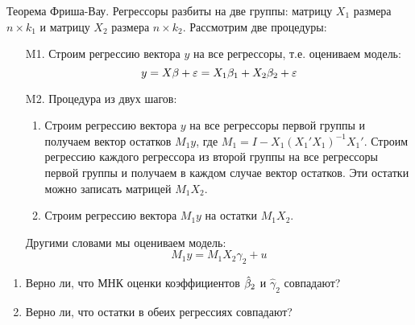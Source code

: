 \begin{problem}
Теорема Фриша-Вау. Регрессоры разбиты на две группы: матрицу $X_1$ размера $n\times k_1$ и матрицу $X_2$ размера $n\times k_2$. Рассмотрим две процедуры:
\begin{enumerate}
\item[M1.] Строим регрессию вектора $y$ на все регрессоры, т.е. оцениваем модель:
\[ 
y=X\beta + \varepsilon = X_1 \beta_1 + X_2 \beta_2 +\varepsilon 
\]
\item[M2.] Процедура из двух шагов:
\begin{enumerate}
\item Строим регрессию вектора $y$ на все регрессоры первой группы и получаем вектор остатков $M_1 y$, где $M_1=I-X_1(X_1'X_1)^{-1}X_1'$. Строим регрессию каждого регрессора из второй группы на все регрессоры первой группы и получаем в каждом случае вектор остатков. Эти остатки можно записать матрицей $M_1 X_2$. 
\item Строим регрессию вектора $M_1 y$ на остатки $M_1 X_2$.
\end{enumerate}
Другими словами мы оцениваем модель:
\[
M_1 y = M_1 X_2 \gamma_2 + u
\]

\end{enumerate}
\begin{enumerate}
\item Верно ли, что МНК оценки коэффициентов $\hat{\beta}_2$ и $\hat{\gamma}_2$ совпадают?
\item Верно ли, что остатки в обеих регрессиях совпадают?
\end{enumerate}
\end{problem}

